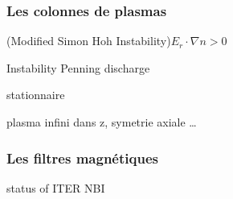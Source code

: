 \begin{refsection}
\subsubsection{Les colonnes de plasmas}
\parencite{RosenbluthSimon}

\parencite{Sakawa} (Modified Simon Hoh Instability)$E_r\cdot\nabla n > 0$

\parencite{Hoh} Instability Penning discharge

\parencite{Fruchtman} stationnaire

\parencite{Sternberg} plasma infini dans z, symetrie axiale \ldots 

\subsubsection{Les filtres magnétiques}
\parencite{Hemsworth} status of ITER NBI

\parencite{Rosenbluth}\parencite{Chandrasekhar}
%
%
\end{refsection}

